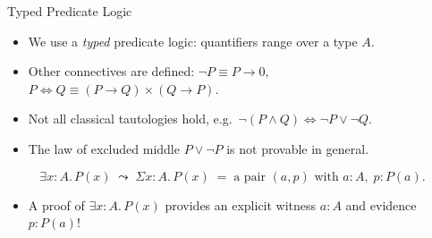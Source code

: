 \documentclass[aspectratio=169,11pt]{beamer}
\begin{document}
\begin{frame}{Typed Predicate Logic}
  \begin{itemize}
    \item We use a \textit{typed} predicate logic: quantifiers range over a type \(A\).
    \item Other connectives are defined: \(\neg P \equiv P \to 0\), \quad \(P \Leftrightarrow Q \equiv (P \to Q) \times (Q \to P)\).
    \item Not all classical tautologies hold, e.g.\ \(\neg(P \wedge Q) \Leftrightarrow \neg P \vee \neg Q\).
    \item The law of excluded middle \(P \vee \neg P\) is not provable in general.
  \end{itemize}

  \vspace{0.4em}
  \[
    \exists x : A.\, P(x)
    \;\leadsto\;
    \Sigma x : A.\, P(x)
    \;=\;
    \text{a pair } (a, p) \text{ with } a : A,\; p : P(a).
  \]

  \vspace{0.3em}
  \begin{itemize}
    \item A proof of \(\exists x : A.\, P(x)\) provides an explicit witness \(a : A\) and evidence \(p : P(a)\)!
  \end{itemize}
\end{frame}
\end{document}
